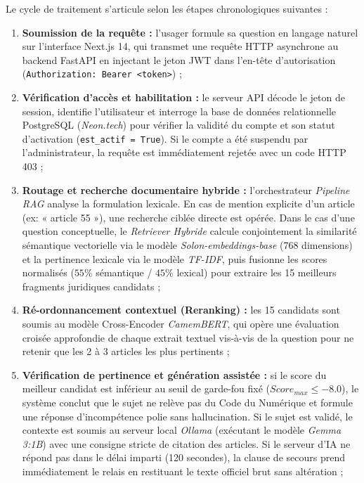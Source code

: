 Le cycle de traitement s'articule selon les étapes chronologiques suivantes :
\begin{enumerate}
    \item \textbf{Soumission de la requête :} l'usager formule sa question en langage naturel sur l'interface Next.js 14, qui transmet une requête HTTP asynchrone au backend FastAPI en injectant le jeton JWT dans l'en-tête d'autorisation (\texttt{Authorization: Bearer <token>}) ;
    
    \item \textbf{Vérification d'accès et habilitation :} le serveur API décode le jeton de session, identifie l'utilisateur et interroge la base de données relationnelle PostgreSQL (\textit{Neon.tech}) pour vérifier la validité du compte et son statut d'activation (\texttt{est\_actif = True}). Si le compte a été suspendu par l'administrateur, la requête est immédiatement rejetée avec un code HTTP 403 ;
    
    \item \textbf{Routage et recherche documentaire hybride :} l'orchestrateur \textit{Pipeline RAG} analyse la formulation lexicale. En cas de mention explicite d'un article (ex: « article 55 »), une recherche ciblée directe est opérée. Dans le cas d'une question conceptuelle, le \textit{Retriever Hybride} calcule conjointement la similarité sémantique vectorielle via le modèle \textit{Solon-embeddings-base} (768 dimensions) et la pertinence lexicale via le modèle \textit{TF-IDF}, puis fusionne les scores normalisés ($55\%$ sémantique / $45\%$ lexical) pour extraire les 15 meilleurs fragments juridiques candidats ;
    
    \item \textbf{Ré-ordonnancement contextuel (Reranking) :} les 15 candidats sont soumis au modèle Cross-Encoder \textit{CamemBERT}, qui opère une évaluation croisée approfondie de chaque extrait textuel vis-à-vis de la question pour ne retenir que les 2 à 3 articles les plus pertinents ;
    
    \item \textbf{Vérification de pertinence et génération assistée :} si le score du meilleur candidat est inférieur au seuil de garde-fou fixé ($Score_{max} \le -8.0$), le système conclut que le sujet ne relève pas du Code du Numérique et formule une réponse d'incompétence polie sans hallucination. Si le sujet est validé, le contexte est soumis au serveur local \textit{Ollama} (exécutant le modèle \textit{Gemma 3:1B}) avec une consigne stricte de citation des articles. Si le serveur d'IA ne répond pas dans le délai imparti (120 secondes), la clause de secours prend immédiatement le relais en restituant le texte officiel brut sans altération ;
    

\end{enumerate}
